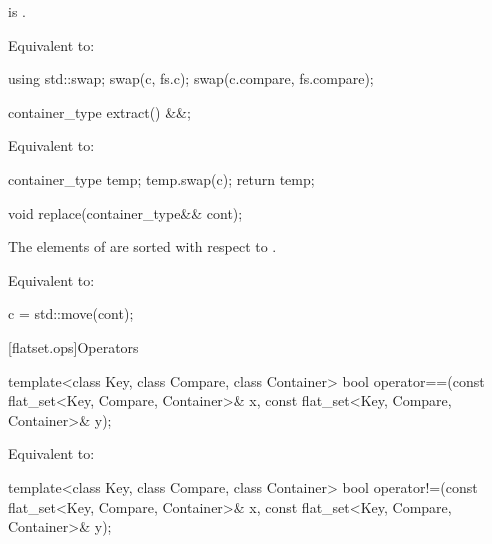 \begin{codeblock}
\begin{codeblock}
\begin{codeblock}
\begin{addedblock}
\begin{itemdescr}
\pnum \constraints {} is .

\pnum \effects Equivalent to:
\begin{codeblock}
using std::swap;
swap(c, fs.c);
swap(c.compare, fs.compare);
\end{codeblock}
\end{itemdescr}

%
\begin{itemdecl}
container_type extract() &&;
\end{itemdecl}

\begin{itemdescr}
\effects Equivalent to:
\begin{codeblock}
container_type temp;
temp.swap(c);
return temp;
\end{codeblock}
\end{itemdescr}

%
\begin{itemdecl}
void replace(container_type&& cont);
\end{itemdecl}

\begin{itemdescr}
\pnum \expects
The elements of  are sorted with respect to .

\pnum
\effects Equivalent to:
\begin{codeblock}
c = std::move(cont);
\end{codeblock}
\end{itemdescr}

[flatset.ops]{Operators}

%
\begin{itemdecl}
template<class Key, class Compare, class Container>
  bool operator==(const flat_set<Key, Compare, Container>& x,
                  const flat_set<Key, Compare, Container>& y);
\end{itemdecl}

\begin{itemdescr}
\pnum
\effects Equivalent to:
\end{itemdescr}

%
\begin{itemdecl}
template<class Key, class Compare, class Container>
  bool operator!=(const flat_set<Key, Compare, Container>& x,
                  const flat_set<Key, Compare, Container>& y);
\end{itemdecl}


\end{addedblock}
\end{codeblock}
\end{codeblock}
\end{codeblock}
